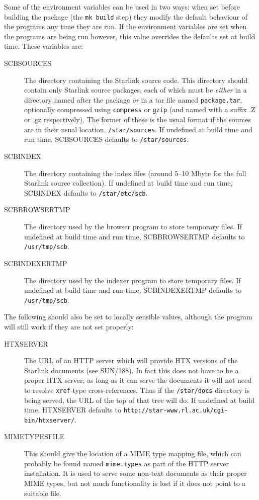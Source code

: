 \documentclass[twoside,11pt]{article}
\newcommand{\xref}[3]{#1}
\renewcommand{\_}{\texttt{\symbol{95}}}
\begin{document}
Some of the environment variables can be used in two ways:
when set before building the package (the {\tt mk build} step)
they modify the default behaviour of the programs any time they are run.  
If the environment variables are set when the programs are being
run however, this value overrides the defaults set at build time.
These variables are:
\begin{description}
\item[SCB\_SOURCES]
The directory containing the Starlink source code.  
This directory should contain only Starlink source packages,
each of which must be {\em either\/} in a directory named after the package
{\em or\/} in a tar file named {\tt package.tar}, optionally compressed
using {\tt compress} or {\tt gzip} (and named with a suffix .Z or .gz 
respectively).
The former of these is the usual format if the sources are in
their usual location, {\tt /star/sources}.
If undefined at build time and run time, SCB\_SOURCES 
defaults to {\tt /star/sources}.
\item[SCB\_INDEX]
The directory containing the index files (around 5--10 Mbyte for the full
Starlink source collection).
If undefined at build time and run time, SCB\_INDEX defaults to
{\tt /star/etc/scb}.
\item[SCB\_BROWSER\_TMP]
The directory used by the browser program to store temporary files. 
If undefined at build time and run time, SCB\_BROWSER\_TMP defaults to
{\tt /usr/tmp/scb}.
\item[SCB\_INDEXER\_TMP]
The directory used by the indexer program to store temporary files. 
If undefined at build time and run time, SCB\_INDEXER\_TMP defaults to
{\tt /usr/tmp/scb}.
\end{description}
The following should also be set to locally sensible values,
although the program will still work if they are not set properly:
\begin{description}
\item[HTX\_SERVER]
The URL of an HTTP server which will provide HTX versions of the Starlink
documents (see \xref{SUN/188}{sun188}{remote_document_servers}).
In fact this does not have to be a proper HTX server; as long as it
can serve the documents it will not need to resolve {\tt xref\_}-type 
cross-references.
Thus if the {\tt /star/docs} directory is being served, the URL of
the top of that tree will do.
If undefined at build time, HTX\_SERVER defaults to 
{\tt http://star-www.rl.ac.uk/cgi-bin/htxserver/}.
\item[MIMETYPES\_FILE]
This should give the location of a MIME type mapping file,
which can probably be found named {\tt mime.types}
as part of the HTTP server installation.
It is used to serve some non-text documents as their proper MIME types,
but not much functionality is lost if it does not point to a suitable file.
\end{description}
\end{document}
